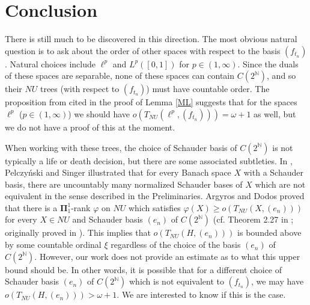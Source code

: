 \documentclass{article}
\newcommand{\N}{\mathbb N}
\begin{document}
\section{Conclusion}

There is still much to be discovered in this direction. The most obvious natural question is to ask about the order of other spaces with respect to the basis $(f_{t_n})$. Natural choices include $\ell^p$ and $L^p([0,1])$ for $p\in(1,\infty)$. Since the duals of these spaces are separable, none of these spaces can contain $C(2^\N)$, and so their $NU$ trees (with respect to $(f_{t_n})$) must have countable order. The proposition from \cite{TJ} cited in the proof of Lemma \ref{ML} suggests that for the spaces $\ell^p$ ($p\in (1,\infty)$) we should have $o(T_{NU}(\ell^p, (f_{t_n}))) = \omega + 1$ as well, but we do not have a proof of this at the moment. 

When working with these trees, the choice of Schauder basis of $C(2^\N)$ is not typically a life or death decision, but there are some associated subtleties. In \cite{PS}, Pelczy\'{n}ski and Singer illustrated that for every Banach space $X$ with a Schauder basis, there are uncountably many normalized Schauder bases of $X$ which are not equivalent in the sense described in the Preliminaries. Argyros and Dodos proved that there is a $\boldsymbol \Pi_1^1$-rank $\varphi$ on $NU$ which satisfies $\varphi(X)\geq o(T_{NU}(X,(e_n)))$ for every $X\in NU$ and Schauder basis $(e_n)$ of $C(2^\N)$ (cf. Theorem 2.27 in \cite{D}; originally proved in \cite{AD}). This implies that $o(T_{NU}(H, (e_n)))$ is bounded above by some countable ordinal $\xi$ regardless of the choice of the basis $(e_n)$ of $C(2^\N)$. However, our work does not provide an estimate as to what this upper bound should be. In other words, it is possible that for a different choice of Schauder basis $(e_n)$ of $C(2^\N)$ which is not equivalent to $(f_{t_n})$, we may have $o(T_{NU}(H,(e_n))) > \omega + 1$. We are interested to know if this is the case.

\printbibliography
\end{document}
